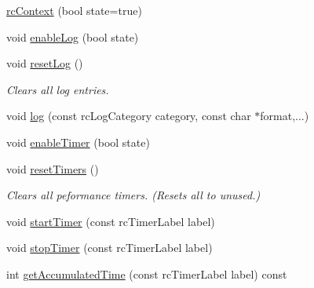 \begin{DoxyCompactItemize}
\item 
\hyperlink{classrcContext_ae405295998d6c1db0ceb60d0f64559bc}{rc\+Context} (bool state=true)
\item 
void \hyperlink{classrcContext_a03dcf9240dc69a7c329c15e32be12d8e}{enable\+Log} (bool state)
\item 
\mbox{\label{classrcContext_a68403737730ee112c523890a9fdc237d}} 
void \hyperlink{classrcContext_a68403737730ee112c523890a9fdc237d}{reset\+Log} ()
\begin{DoxyCompactList}\small\item\em Clears all log entries. \end{DoxyCompactList}\item 
void \hyperlink{classrcContext_ae3cc278477b1b923d03ea50e3ae96013}{log} (const rc\+Log\+Category category, const char $\ast$format,...)
\item 
void \hyperlink{classrcContext_aa4680430d751824f83634ac753df9669}{enable\+Timer} (bool state)
\item 
\mbox{\label{classrcContext_a2fcc58bb1e29bbb9a7dfb834efff4a6d}} 
void \hyperlink{classrcContext_a2fcc58bb1e29bbb9a7dfb834efff4a6d}{reset\+Timers} ()
\begin{DoxyCompactList}\small\item\em Clears all peformance timers. (Resets all to unused.) \end{DoxyCompactList}\item 
void \hyperlink{classrcContext_a3c8d3035e1046dd8907b10b7d9c8de57}{start\+Timer} (const rc\+Timer\+Label label)
\item 
void \hyperlink{classrcContext_a3f7042723b8d99d486575eb3d592af25}{stop\+Timer} (const rc\+Timer\+Label label)
\item 
int \hyperlink{classrcContext_a17e7b79afff2f042961698aa1c818c3d}{get\+Accumulated\+Time} (const rc\+Timer\+Label label) const
\end{DoxyCompactItemize}

